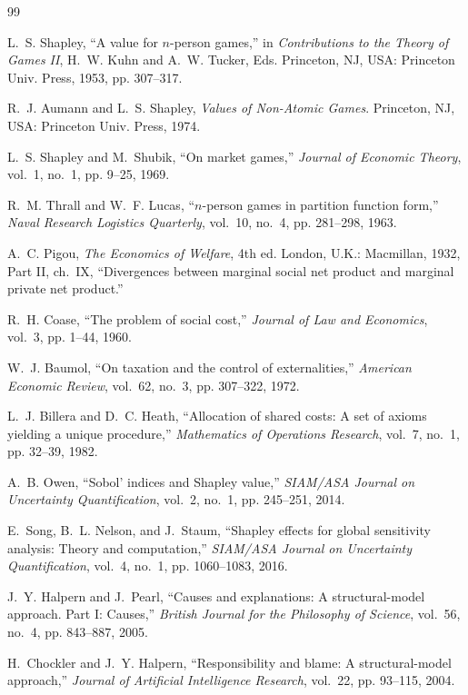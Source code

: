 \documentclass[journal, a4paper]{IEEEtran}
\begin{document}
\begin{thebibliography}{99}

L.~S. Shapley, ``A value for $n$-person games,'' in \emph{Contributions to the Theory of Games II}, H.~W. Kuhn and A.~W. Tucker, Eds. Princeton, NJ, USA: Princeton Univ. Press, 1953, pp. 307--317.

R.~J. Aumann and L.~S. Shapley, \emph{Values of Non-Atomic Games}. Princeton, NJ, USA: Princeton Univ. Press, 1974.

L.~S. Shapley and M.~Shubik, ``On market games,'' \emph{Journal of Economic Theory}, vol.~1, no.~1, pp. 9--25, 1969.

R.~M. Thrall and W.~F. Lucas, ``$n$-person games in partition function form,'' \emph{Naval Research Logistics Quarterly}, vol.~10, no.~4, pp. 281--298, 1963.

A.~C. Pigou, \emph{The Economics of Welfare}, 4th ed. London, U.K.: Macmillan, 1932, Part II, ch.~IX, ``Divergences between marginal social net product and marginal private net product.''

R.~H. Coase, ``The problem of social cost,'' \emph{Journal of Law and Economics}, vol.~3, pp. 1--44, 1960.

W.~J. Baumol, ``On taxation and the control of externalities,'' \emph{American Economic Review}, vol.~62, no.~3, pp. 307--322, 1972.

L.~J. Billera and D.~C. Heath, ``Allocation of shared costs: A set of axioms yielding a unique procedure,'' \emph{Mathematics of Operations Research}, vol.~7, no.~1, pp. 32--39, 1982.

A.~B. Owen, ``Sobol' indices and Shapley value,'' \emph{SIAM/ASA Journal on Uncertainty Quantification}, vol.~2, no.~1, pp. 245--251, 2014.

E.~Song, B.~L. Nelson, and J.~Staum, ``Shapley effects for global sensitivity analysis: Theory and computation,'' \emph{SIAM/ASA Journal on Uncertainty Quantification}, vol.~4, no.~1, pp. 1060--1083, 2016.

J.~Y. Halpern and J.~Pearl, ``Causes and explanations: A structural-model approach. Part I: Causes,'' \emph{British Journal for the Philosophy of Science}, vol.~56, no.~4, pp. 843--887, 2005.

H.~Chockler and J.~Y. Halpern, ``Responsibility and blame: A structural-model approach,'' \emph{Journal of Artificial Intelligence Research}, vol.~22, pp. 93--115, 2004.


\end{thebibliography}
\end{document}

